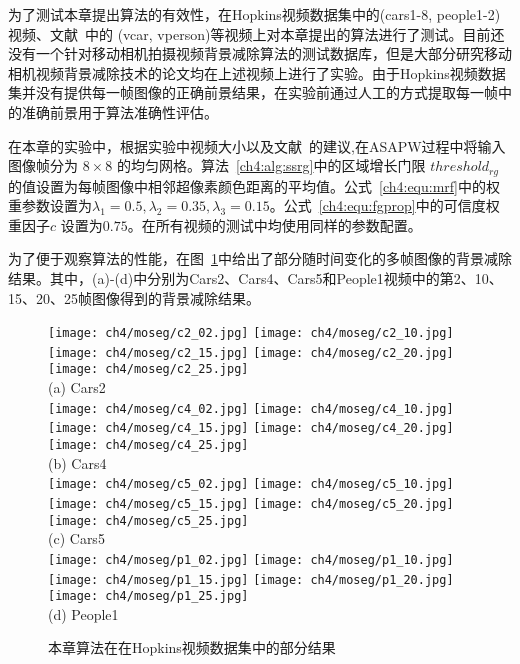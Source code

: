 为了测试本章提出算法的有效性，在Hopkins视频数据集\cite{HopKinsDataSet}中的(cars1-8, people1-2)视频、文献~中的 (vcar, vperson)等视频上对本章提出的算法进行了测试。目前还没有一个针对移动相机拍摄视频背景减除算法的测试数据库，但是大部分研究移动相机视频背景减除技术的论文均在上述视频上进行了实验\cite{iccv2009,LimPRFloating,Multitransform,kwak2011Generalized}。由于Hopkins视频数据集并没有提供每一帧图像的正确前景结果，在实验前通过人工的方式提取每一帧中的准确前景用于算法准确性评估。\par
在本章的实验中，根据实验中视频大小以及文献~\cite{Liu_2013ASAP}的建议,在ASAPW过程中将输入图像帧分为 $8\times8$ 的均匀网格。算法~\ref{ch4:alg:ssrg}中的区域增长门限 $threshold_{rg}$ 的值设置为每帧图像中相邻超像素颜色距离的平均值。公式~\ref{ch4:equ:mrf}中的权重参数设置为$\lambda_{1} = 0.5, \lambda_{2} = 0.35, \lambda_{3} = 0.15$。公式~\ref{ch4:equ:fgprop}中的可信度权重因子$c$ 设置为$0.75$。在所有视频的测试中均使用同样的参数配置。 \par
为了便于观察算法的性能，在图~\ref{ch4:fig:MosegResults}中给出了部分随时间变化的多帧图像的背景减除结果。其中，(a)-(d)中分别为Cars2、Cars4、Cars5和People1视频中的第2、10、15、20、25帧图像得到的背景减除结果。
\begin{figure}[htb]
\begin{center}
 \texttt{[image: ch4/moseg/c2\_02.jpg]}
  \texttt{[image: ch4/moseg/c2\_10.jpg]}
  \texttt{[image: ch4/moseg/c2\_15.jpg]}
  \texttt{[image: ch4/moseg/c2\_20.jpg]}
  \texttt{[image: ch4/moseg/c2\_25.jpg]} \\
(a) Cars2\\
\texttt{[image: ch4/moseg/c4\_02.jpg]}
  \texttt{[image: ch4/moseg/c4\_10.jpg]}
  \texttt{[image: ch4/moseg/c4\_15.jpg]}
  \texttt{[image: ch4/moseg/c4\_20.jpg]}
  \texttt{[image: ch4/moseg/c4\_25.jpg]} \\

(b) Cars4\\
\texttt{[image: ch4/moseg/c5\_02.jpg]}
  \texttt{[image: ch4/moseg/c5\_10.jpg]}
  \texttt{[image: ch4/moseg/c5\_15.jpg]}
  \texttt{[image: ch4/moseg/c5\_20.jpg]}
  \texttt{[image: ch4/moseg/c5\_25.jpg]} \\

(c) Cars5\\
\texttt{[image: ch4/moseg/p1\_02.jpg]}
  \texttt{[image: ch4/moseg/p1\_10.jpg]}
  \texttt{[image: ch4/moseg/p1\_15.jpg]}
  \texttt{[image: ch4/moseg/p1\_20.jpg]}
  \texttt{[image: ch4/moseg/p1\_25.jpg]} \\

(d) People1\\
\end{center}
\caption{本章算法在在Hopkins视频数据集\cite{HopKinsDataSet}中的部分结果}
\label{ch4:fig:MosegResults}       %
\end{figure}


